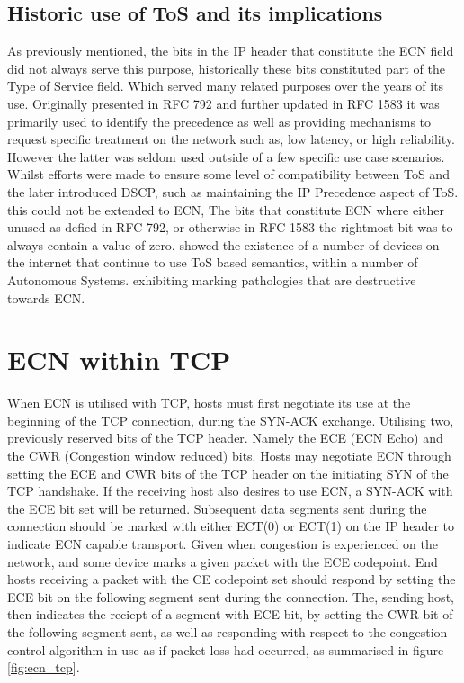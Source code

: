 \documentclass{l4proj}
\begin{document}
\subsection{Historic use of ToS and its implications}

As previously mentioned, the bits in the IP header that constitute the ECN field did not always serve this purpose, historically these bits constituted part of the Type of Service field. Which served many related purposes over the years of its use. Originally presented in RFC 792 and further updated in RFC 1583 it was primarily used to identify the precedence as well as providing mechanisms to request specific treatment on the network such as, low latency, or high reliability. However the latter was seldom used outside of a few specific use case scenarios. Whilst efforts were made to ensure some level of compatibility between ToS and the later introduced DSCP, such as maintaining the IP Precedence aspect of ToS. this could not be extended to ECN, The bits that constitute ECN where either unused as defied in RFC 792, or otherwise in RFC 1583 the rightmost bit was to always contain a value of zero. \cite{custura_exploring_2017} showed the existence of a number of devices on the internet that continue to use ToS based semantics, within a number of Autonomous Systems. exhibiting marking pathologies that are destructive towards ECN.

\section{ECN within TCP}



When ECN is utilised with TCP, hosts must first negotiate its use at the beginning of the TCP connection, during the SYN-ACK exchange. Utilising two, previously reserved bits of the TCP header. Namely the ECE (ECN Echo) and the CWR (Congestion window reduced) bits. Hosts may negotiate ECN through setting the ECE and CWR bits of the TCP header on the initiating SYN of the TCP handshake. If the receiving host also desires to use ECN, a SYN-ACK with the ECE bit set will be returned. Subsequent data segments sent during the connection should be marked with either ECT(0) or ECT(1) on the IP header to indicate ECN capable transport. Given when congestion is experienced on the network, and some device marks a given packet with the ECE codepoint. End hosts receiving a packet with the CE codepoint set should respond by setting the ECE bit on the following segment sent during the connection. The, sending host, then indicates the reciept of a segment with ECE bit, by setting the CWR bit of the following segment sent, as well as responding with respect to the congestion control algorithm in use as if packet loss had occurred, as summarised in figure \ref{fig:ecn_tcp}.
\end{document}
